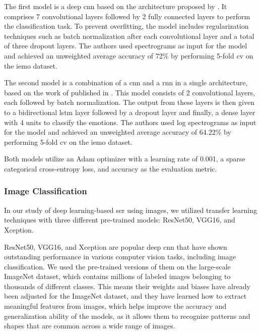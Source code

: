 The first model is a deep \ac{cnn} based on the architecture proposed by \citeauthor{Mustaqeem2019} \cite{Mustaqeem2019}. It comprises 7 convolutional layers followed by 2 fully connected layers to perform the classification task. To prevent overfitting, the model includes regularization techniques such as batch normalization after each convolutional layer and a total of three dropout layers. The authors used spectrograms as input for the model and achieved an unweighted average accuracy of 72\% by performing 5-fold \ac{cv} on the \ac{iemo} dataset.

The second model is a combination of a \ac{cnn} and a \ac{rnn} in a single architecture, based on the work of \citeauthor{ma18b_interspeech} \cite{ma18b_interspeech} published in \citeyear{ma18b_interspeech}. This model consists of 2 convolutional layers, each followed by batch normalization. The output from these layers is then given to a bidirectional \ac{lstm} layer followed by a dropout layer and finally, a dense layer with 4 units to classify the emotions. The authors used log spectrograms as input for the model and achieved an unweighted average accuracy of 64.22\% by performing 5-fold \ac{cv} on the \ac{iemo} dataset.

Both models utilize an Adam optimizer with a learning rate of 0.001, a sparse categorical cross-entropy loss, and accuracy as the evaluation metric.

\subsubsection{Image Classification}

In our study of deep learning-based \ac{ser} using images, we utilized transfer learning techniques with three different pre-trained models: ResNet50, VGG16, and Xception.

ResNet50, VGG16, and Xception are popular deep \ac{cnn} that have shown outstanding performance in various computer vision tasks, including image classification. We used the pre-trained versions of them on the large-scale ImageNet dataset, which contains millions of labeled images belonging to thousands of different classes. This means their weights and biases have already been adjusted for the ImageNet dataset, and they have learned how to extract meaningful features from images, which helps improve the accuracy and generalization ability of the models, as it allows them to recognize patterns and shapes that are common across a wide range of images.

